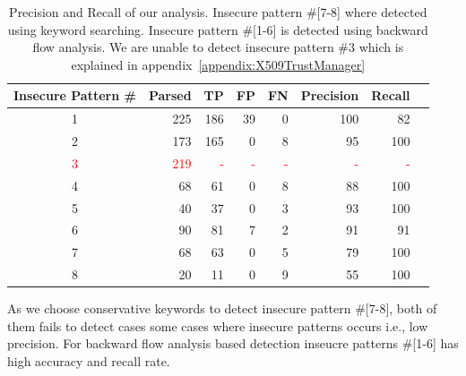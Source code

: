 \begin{table}[ht]
\begin{tabular}{|c|r|r|r|r|r|r|r|}
\toprule
Insecure  Pattern \# & Parsed & TP & FP & FN & Precision & Recall \\ \midrule
1 & 225 & 186 & 39 & 0 & 100 & 82 \\
2 & 173 & 165 & 0 & 8 & 95 & 100 \\
\textcolor{red}{3} & \textcolor{red}{219} & \textcolor{red}{-} & \textcolor{red}{-} & \textcolor{red}{-} & \textcolor{red}{-} & \textcolor{red}{-}\\
4 & 68 & 61 &  0 & 8& 88 & 100 \\
5 & 40 & 37 & 0 & 3& 93 & 100 \\
6 & 90 & 81 & 7 & 2 & 91 & 91 \\ \midrule
7 & 68 & 63 & 0& 5 & 79 & 100 \\
8 & 20 & 11 & 0& 9 & 55 & 100\\ %
\bottomrule
\end{tabular}
\caption{Precision and Recall of our analysis. Insecure pattern \#[7-8] where detected using keyword
searching. Insecure pattern \#[1-6] is detected using backward flow analysis. We are unable to detect
insecure pattern \#3 which is explained in appendix~\ref{appendix:X509TrustManager} 
}
\label{tab:results}
\end{table}


As we choose conservative keywords to  detect insecure pattern \#[7-8], 
both of them fails to detect cases some cases where insecure patterns occurs i.e., low precision. 
For backward flow analysis based detection inseucre patterns \#[1-6] has high accuracy and recall rate.